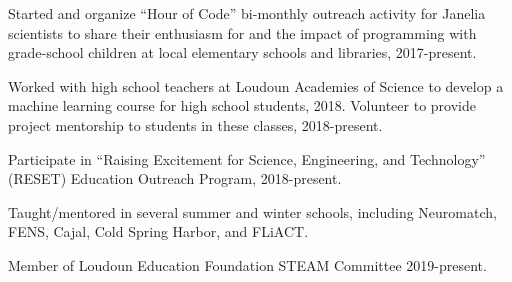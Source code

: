 \documentclass[11pt, letterpaper]{awesome-cv}
\begin{document}
\vspace{\acvSectionContentTopSkip}
\vspace{2mm}

\begin{cvitems}
\item Started and organize ``Hour of Code'' bi-monthly outreach activity for Janelia scientists to share their enthusiasm for and the impact of programming with grade-school children at local elementary schools and libraries, 2017-present.
\item Worked with high school teachers at Loudoun Academies of Science to develop a machine learning course for high school students, 2018. Volunteer to provide project mentorship to students in these classes, 2018-present.
\item Participate in ``Raising Excitement for Science, Engineering, and Technology'' (RESET) Education Outreach Program, 2018-present.
\item Taught/mentored in several summer and winter schools, including Neuromatch, FENS, Cajal, Cold Spring Harbor, and FLiACT. 
\item Member of Loudoun Education Foundation STEAM Committee 2019-present.
\end{cvitems}
\vspace{\acvSectionContentTopSkip}

\vspace{\acvSectionContentTopSkip}
\end{document}
